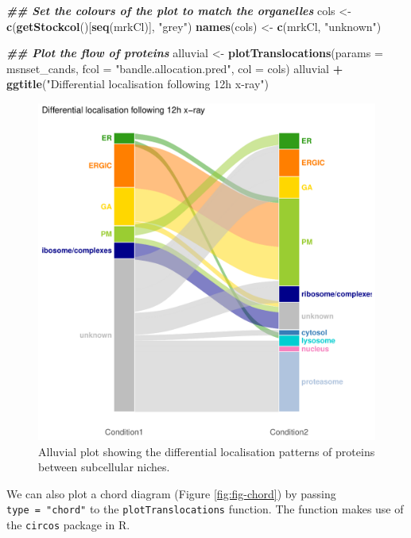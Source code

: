 \documentclass[9pt,a4paper,]{extarticle}
\newenvironment{Shaded}{\begin{snugshade}}{\end{snugshade}}
\newcommand{\AttributeTok}[1]{\textcolor[rgb]{0.13,0.29,0.53}{#1}}
\newcommand{\DocumentationTok}[1]{\textcolor[rgb]{0.56,0.35,0.01}{\textbf{\textit{#1}}}}
\newcommand{\FunctionTok}[1]{\textcolor[rgb]{0.13,0.29,0.53}{\textbf{#1}}}
\newcommand{\NormalTok}[1]{#1}
\newcommand{\OtherTok}[1]{\textcolor[rgb]{0.56,0.35,0.01}{#1}}
\newcommand{\SpecialCharTok}[1]{\textcolor[rgb]{0.81,0.36,0.00}{\textbf{#1}}}
\newcommand{\StringTok}[1]{\textcolor[rgb]{0.31,0.60,0.02}{#1}}
\begin{document}
\begin{Shaded}
\begin{Highlighting}[]
\DocumentationTok{\#\# Set the colours of the plot to match the organelles}
\NormalTok{cols }\OtherTok{\textless{}{-}} \FunctionTok{c}\NormalTok{(}\FunctionTok{getStockcol}\NormalTok{()[}\FunctionTok{seq}\NormalTok{(mrkCl)], }\StringTok{"grey"}\NormalTok{)}
\FunctionTok{names}\NormalTok{(cols) }\OtherTok{\textless{}{-}} \FunctionTok{c}\NormalTok{(mrkCl, }\StringTok{"unknown"}\NormalTok{)}

\DocumentationTok{\#\# Plot the flow of proteins}
\NormalTok{alluvial }\OtherTok{\textless{}{-}} \FunctionTok{plotTranslocations}\NormalTok{(}\AttributeTok{params =}\NormalTok{ msnset\_cands, }
                               \AttributeTok{fcol =} \StringTok{"bandle.allocation.pred"}\NormalTok{, }
                               \AttributeTok{col =}\NormalTok{ cols)}
\NormalTok{alluvial }\SpecialCharTok{+} \FunctionTok{ggtitle}\NormalTok{(}\StringTok{"Differential localisation following 12h x{-}ray"}\NormalTok{)}
\end{Highlighting}
\end{Shaded}

\begin{figure}[H]

{\centering \includegraphics[width=0.7\linewidth,]{figs/alluvial_plot} 

}

\caption{Alluvial plot showing the differential localisation patterns of proteins between subcellular niches.}\label{fig:fig-alluvial}
\end{figure}

We can also plot a chord diagram (Figure \ref{fig:fig-chord}) by passing \texttt{type\ =\ "chord"} to the
\texttt{plotTranslocations} function. The function makes use of the \texttt{circos} package
in R.
\end{document}

